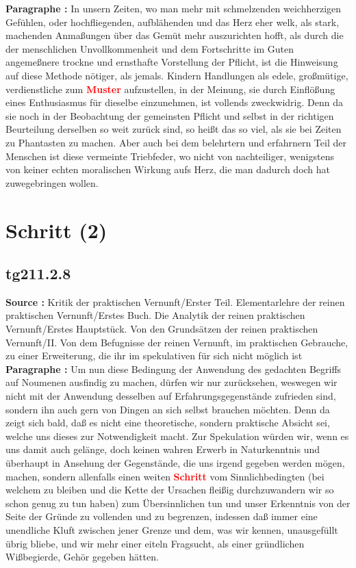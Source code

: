 \documentclass[a4paper,12pt,twoside]{book}
\newcommand{\match}[1]{\textcolor{red}{\textbf{#1}}}
\newcommand{\unnumberedsection}[1]{
	\section*{#1}
	\addcontentsline{toc}{section}{#1}
	\markright{#1}
}
\begin{document}
	\noindent\textbf{Paragraphe : }In unsern Zeiten, wo man mehr mit schmelzenden weichherzigen Gefühlen, oder hochfliegenden, aufblähenden und das Herz eher welk, als stark, machenden Anmaßungen über das Gemüt mehr auszurichten hofft, als durch die der menschlichen Unvollkommenheit und dem Fortschritte im Guten angemeßnere trockne und ernsthafte Vorstellung der Pflicht, ist die Hinweisung auf diese Methode nötiger, als jemals. Kindern Handlungen als edele, großmütige, verdienstliche zum \match{Muster} aufzustellen, in der Meinung, sie durch Einflößung eines Enthusiasmus für dieselbe einzunehmen, ist vollends zweckwidrig. Denn da sie noch in der Beobachtung der gemeinsten Pflicht und selbst in der richtigen Beurteilung derselben so weit zurück sind, so heißt das so viel, als sie bei Zeiten zu Phantasten zu machen. Aber auch bei dem belehrtern und erfahrnern Teil der Menschen ist diese vermeinte Triebfeder, wo nicht von nachteiliger, wenigstens von keiner echten moralischen Wirkung aufs Herz, die man dadurch doch hat zuwegebringen wollen. 
	
	\unnumberedsection{Schritt (2)} 
	\subsection*{tg211.2.8} 
	\textbf{Source : }Kritik der praktischen Vernunft/Erster Teil. Elementarlehre der reinen praktischen Vernunft/Erstes Buch. Die Analytik der reinen praktischen Vernunft/Erstes Hauptstück. Von den Grundsätzen der reinen praktischen Vernunft/II. Von dem Befugnisse der reinen Vernunft, im praktischen Gebrauche, zu einer Erweiterung, die ihr im spekulativen für sich nicht möglich ist\\  
	
	\noindent\textbf{Paragraphe : }Um nun diese Bedingung der Anwendung des gedachten Begriffs auf Noumenen ausfindig zu machen, dürfen wir nur zurücksehen, weswegen wir nicht mit der Anwendung desselben auf Erfahrungsgegenstände zufrieden sind, sondern ihn auch gern von Dingen an sich selbst brauchen möchten. Denn da zeigt sich bald, daß es nicht eine theoretische, sondern praktische Absicht sei, welche  uns dieses zur Notwendigkeit macht. Zur Spekulation würden wir, wenn es uns damit auch gelänge, doch keinen wahren Erwerb in Naturkenntnis und überhaupt in Ansehung der Gegenstände, die uns irgend gegeben werden mögen, machen, sondern allenfalls einen weiten \match{Schritt} vom Sinnlichbedingten (bei welchem zu bleiben und die Kette der Ursachen fleißig durchzuwandern wir so schon genug zu tun haben) zum Übersinnlichen tun und unser Erkenntnis von der Seite der Gründe zu vollenden und zu begrenzen, indessen daß immer eine unendliche Kluft zwischen jener Grenze und dem, was wir kennen, unausgefüllt übrig bliebe, und wir mehr einer eiteln Fragsucht, als einer gründlichen Wißbegierde, Gehör gegeben hätten. 
	
\end{document}

